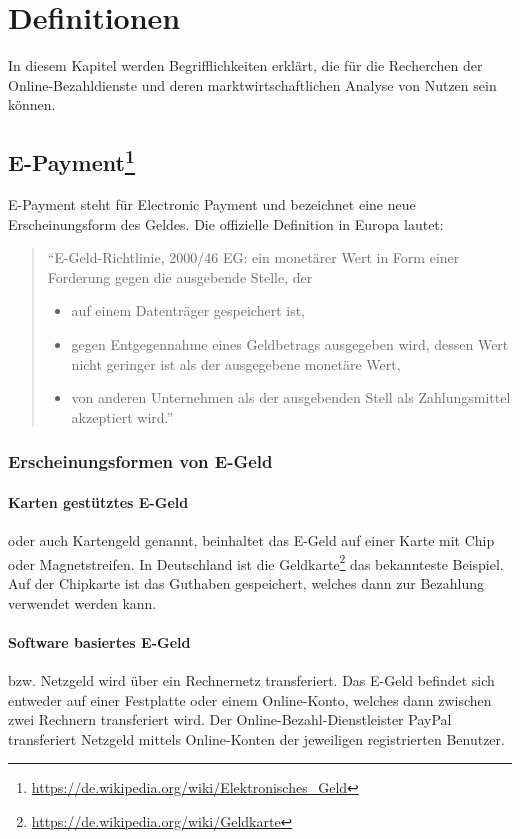 \clearpage
\section{Definitionen}

In diesem Kapitel werden Begrifflichkeiten erklärt, die für die Recherchen der Online-Bezahldienste und deren marktwirtschaftlichen Analyse von Nutzen sein können. 

\subsection[E-Payment]{E-Payment\footnote{\url{ https://de.wikipedia.org/wiki/Elektronisches_Geld}}}

E-Payment steht für Electronic Payment und bezeichnet eine neue Erscheinungsform des Geldes. Die offizielle Definition in Europa lautet:
\begin{quote}
``E-Geld-Richtlinie, 2000/46 EG: ein monetärer Wert in Form einer Forderung gegen die ausgebende Stelle, der
\begin{itemize}
	\item auf einem Datenträger gespeichert ist,
	\item gegen Entgegennahme eines Geldbetrags ausgegeben wird, dessen Wert nicht geringer ist als der ausgegebene monetäre Wert,
	\item von anderen Unternehmen als der ausgebenden Stell als Zahlungsmittel akzeptiert wird.''
\end{itemize}
\end{quote}



\subsubsection{Erscheinungsformen von E-Geld}

\paragraph{Karten gestütztes E-Geld}oder auch Kartengeld genannt, beinhaltet das E-Geld auf einer Karte mit Chip oder Magnetstreifen. In Deutschland ist die Geldkarte\footnote{\url{  https://de.wikipedia.org/wiki/Geldkarte}} das bekannteste Beispiel. Auf der Chipkarte ist das Guthaben gespeichert, welches dann zur Bezahlung verwendet werden kann.

\paragraph{Software basiertes E-Geld}bzw. Netzgeld wird über ein Rechnernetz transferiert. Das E-Geld befindet sich entweder auf einer Festplatte oder einem Online-Konto, welches dann zwischen zwei Rechnern transferiert wird. Der Online-Bezahl-Dienstleister PayPal transferiert Netzgeld mittels Online-Konten der jeweiligen registrierten Benutzer.

